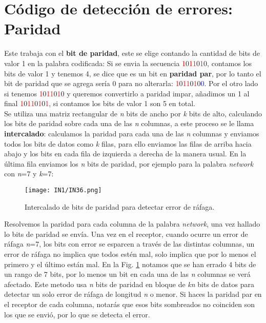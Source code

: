 \documentclass[
	12pt, %
	fleqn, %
	a4paper, %
	oneside, %
]{LegrandOrangeBook}
\begin{document}
\section{Código de detección de errores: Paridad}
Este trabaja con el \textbf{bit de paridad}, este se elige contando la cantidad de bits de valor 1 en la palabra codificada: Si se envia la secuencia \textcolor{red}{1}0\textcolor{red}{1}\textcolor{red}{1}0\textcolor{red}{1}0, contamos los bits de valor 1 y tenemos 4, se dice que es un bit en \textbf{paridad par}, por lo tanto el bit de paridad que se agrega sería 0 para no alterarla: \textcolor{red}{1}0\textcolor{red}{1}\textcolor{red}{1}0\textcolor{red}{1}0\textcolor{blue}{0}. Por el otro lado si tenemos \textcolor{red}{1}0\textcolor{red}{1}\textcolor{red}{1}0\textcolor{red}{1}0 y queremos convertirlo a paridad impar, añadimos un 1 al final \textcolor{red}{1}0\textcolor{red}{1}\textcolor{red}{1}0\textcolor{red}{1}0\textcolor{red}{1}, si contamos los bits de valor 1 son 5 en total.\\
Se utiliza una matriz rectangular de \textit{n} bits de ancho por \textit{k} bits de alto, calculando los bits de paridad sobre cada una de las \textit{n} columnas, a este proceso se le llama \textbf{intercalado}: calculamos la paridad para cada una de las \textit{n} columnas y enviamos todos los bits de datos como \textit{k} filas, para ello enviamos las filas de arriba hacia abajo y los bits en cada fila de izquierda a derecha de la manera usual. En la última fila enviamos los \textit{n} bits de paridad, por ejemplo para la palabra \textit{network} con \textit{n}=7 y \textit{k}=7:
\begin{figure}[H]
\centering
\texttt{[image: IN1/IN36.png]}
\caption{Intercalado de bits de paridad para detectar error de ráfaga.}
\label{fig: intercalado}
\end{figure}
Resolvemos la paridad para cada columna de la palabra \textit{network}, una vez hallado lo bits de paridad se envía. Una vez en el receptor, cuando ocurre un error de ráfaga \textit{n}=7, los bits con error se esparcen a través de las distintas columnas, un error de ráfaga no implica que todos estén mal, solo implica que por lo menos el primero y el último están mal. En la Fig. \ref{fig: intercalado} notamos que se han errado 4 bits de un rango de 7 bits, por lo menos un bit en cada una de las \textit{n} columnas se verá afectado. Este metodo usa \textit{n} bits de paridad en bloque de \textit{kn} bits de datos para detectar un solo error de ráfaga de longitud \textit{n} o menor. Si haces la paridad par en el receptor de cada columna, notarás que esos bits sombreados no coinciden son los que se envió, por lo que se detecta el error.
\end{document}
